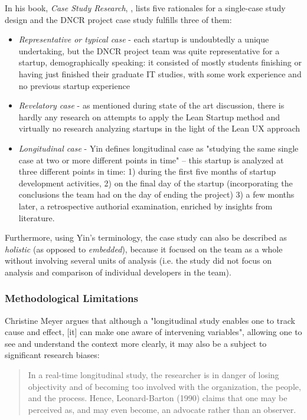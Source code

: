 \documentclass{article}
\begin{document}
In his book, \textit{Case Study Research}, \cite{yin2013case}, lists five rationales for a single-case study design and the DNCR project case study fulfills three of them:
\begin{itemize}
\item \textit{Representative or typical case} - each startup is undoubtedly a unique undertaking, but the DNCR project team was quite representative for a startup, demographically speaking: it consisted of mostly students finishing or having just finished their graduate IT studies, with some work experience and no previous startup experience
\item \textit{Revelatory case} - as mentioned during state of the art discussion, there is hardly any research on attempts to apply the Lean Startup method and virtually no research analyzing startups in the light of the Lean UX approach
\item \textit{Longitudinal case} - Yin defines longitudinal case as "studying the same single case at two or more different points in time" – this startup is analyzed at three different points in time: 1) during the first five months of startup development activities, 2) on the final day of the startup (incorporating the conclusions the team had on the day of ending the project) 3) a few months later, a retrospective authorial examination, enriched by insights from literature.
\end{itemize}

Furthermore, using Yin's terminology, the case study can also be described as \textit{holistic} (as opposed to \textit{embedded}), because it focused on the team as a whole without involving several units of analysis (i.e. the study did not focus on analysis and comparison of individual developers in the team).

\subsubsection{Methodological Limitations}
Christine Meyer \citep{meyer2001case} argues that although a "longitudinal study enables one to track cause and effect, [it] can make one aware of intervening variables", allowing one to see and understand the context more clearly, it may also be a subject to significant research biases:
\begin{quote}
In a real-time longitudinal study, the researcher is in danger of losing objectivity and of becoming too involved with the organization, the people, and the process. Hence, Leonard-Barton (1990) claims that one may be perceived as, and may even become, an advocate rather than an observer.
\end{quote}
\end{document}
